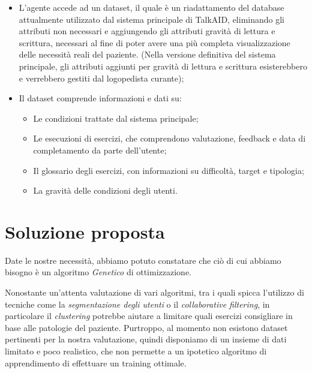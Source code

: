 \documentclass{article}
\begin{document}
    \begin{itemize}
        \item L'agente accede ad un dataset, il quale è un riadattamento del database attualmente utilizzato dal sistema principale di TalkAID, eliminando gli attributi non necessari e aggiungendo gli attributi gravità di lettura e scrittura, necessari al fine di poter avere una più completa visualizzazione delle necessità reali del paziente. (Nella versione definitiva del sistema principale, gli attributi aggiunti per gravità di lettura e scrittura esisterebbero e verrebbero gestiti dal logopedista curante);
        
        \item Il dataset comprende informazioni e dati su:
            \begin{itemize}
                \item Le condizioni trattate dal sistema principale;
                \item Le esecuzioni di esercizi, che comprendono valutazione, feedback e data di completamento da parte dell'utente;
                \item Il glossario degli esercizi, con informazioni su difficoltà, target e tipologia;
                \item La gravità delle condizioni degli utenti.
            \end{itemize}

        

    \end{itemize}

    \pagebreak

    \section{Soluzione proposta}

    Date le nostre necessità, abbiamo potuto constatare che ciò di cui abbiamo bisogno è un algoritmo \textit{Genetico} di ottimizzazione.

    Nonostante un'attenta valutazione di vari algoritmi, tra i quali spicca l'utilizzo di tecniche come la \textit{segmentazione degli utenti} o il \textit{collaborative filtering}, in particolare il \textit{clustering} potrebbe aiutare a limitare quali esercizi consigliare in base alle patologie del paziente. Purtroppo, al momento non esistono dataset pertinenti per la nostra valutazione, quindi disponiamo di un insieme di dati limitato e poco realistico, che non permette a un ipotetico algoritmo di apprendimento di effettuare un training ottimale.
\end{document}
